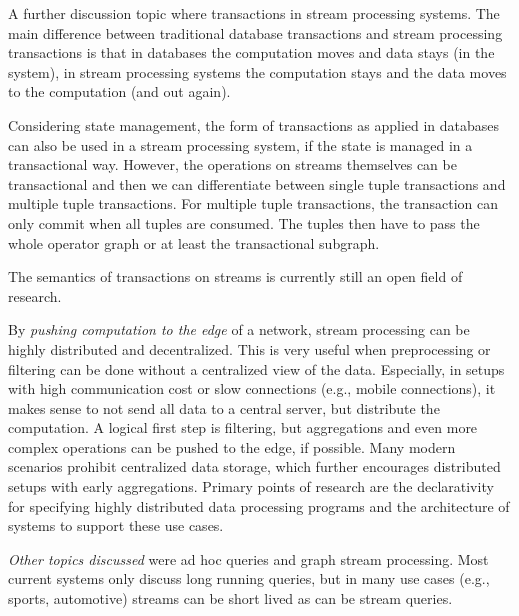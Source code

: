 A further discussion topic where transactions in stream processing systems. 
The main difference between traditional database transactions and stream 
processing transactions is that in databases the computation moves and 
data stays (in the system), in stream processing systems the computation stays
and the data moves to the computation (and out again). 

Considering state management, the form of transactions as applied in databases
can also be used in a stream processing system, if the state is managed in a
transactional way. However, the operations on streams themselves can be 
transactional and then we can differentiate between single tuple transactions 
and multiple tuple transactions. For multiple tuple transactions, the 
transaction can only commit when all tuples are consumed. The tuples then have
to pass the whole operator graph or at least the transactional subgraph. 

The semantics of transactions on streams is currently still an open 
field of research.

By \emph{pushing computation to the edge} of a network, stream processing can 
be highly distributed and decentralized. This is very useful when preprocessing
or filtering can be done without a centralized view of the data. Especially, in 
setups with high communication cost or slow connections (e.g., mobile 
connections), it makes sense to not send all data to a central server, but 
distribute the computation. A logical first step is filtering, but aggregations
and even more complex operations can be pushed to the edge, if possible. Many
modern scenarios prohibit centralized data storage, which further encourages
distributed setups with early aggregations. Primary points of research are the
declarativity for specifying highly distributed data processing programs and 
the architecture of systems to support these use cases. 


\emph{Other topics discussed} were ad hoc queries and graph stream processing.
Most current systems only discuss long running queries, but in many use cases 
(e.g., sports, automotive) streams can be short lived as can be stream queries. 
